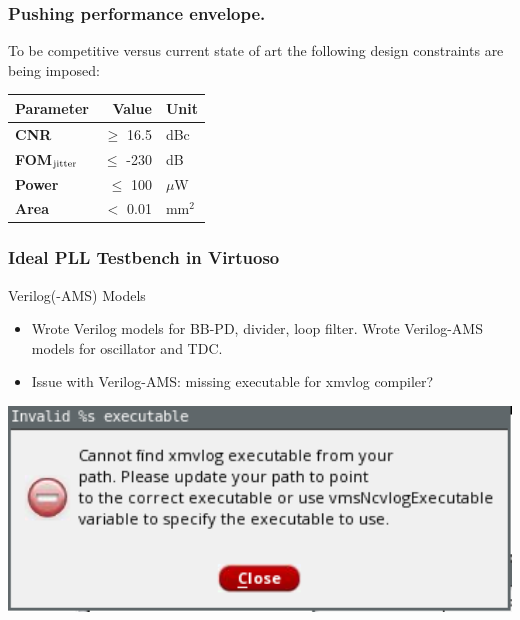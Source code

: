 \documentclass[t, screen, aspectratio=43]{beamer}
\begin{document}
\begin{frame}
	\frametitle{Pushing performance envelope.}
	\begin{block}{}
		\scriptsize
		To be competitive versus current state of art the following design constraints are being imposed:
		\begin{table}[h!]
			\centering
			\def\arraystretch{1.5}		
			\setlength\arrayrulewidth{0.75pt}
			\setlength{\tabcolsep}{1em} %
			\begin{tabular}{|l|r|l|}
				\hline 
				\rule[-1ex]{0pt}{2.5ex} \cellcolor{gray!40}\textbf{Parameter} & \cellcolor{gray!40}\textbf{Value} & \cellcolor{gray!40}\textbf{Unit }\\ 
				\hline 
				\rule[-1ex]{0pt}{2.5ex} \textbf{CNR}  & $\geq$ 16.5 & dBc \\ 
				\hline 
				\rule[-1ex]{0pt}{2.5ex} \textbf{FOM}$_{\textnormal{jitter}}$ & $\leq$ -230 & dB \\ 
				\hline 
				\rule[-1ex]{0pt}{2.5ex} \textbf{Power} & $\leq$ 100  &$\mu$W \\ 
				\hline 
				\rule[-1ex]{0pt}{2.5ex} \textbf{Area} & $<$ 0.01  & mm$^2$ \\ 
				\hline 
			\end{tabular} 
		\end{table}   
	\end{block}    
\end{frame}

\begin{frame}
	\frametitle{Ideal PLL Testbench in Virtuoso}
	\begin{block}{Verilog(-AMS) Models}
	\begin{minipage}{5cm}
		\begin{itemize}[itemsep=4pt,label=\protect---]
			\scriptsize
			\item Wrote Verilog models for BB-PD, divider, loop filter. Wrote Verilog-AMS models for oscillator and TDC.
			\item Issue with Verilog-AMS: missing executable for xmvlog compiler? 
		\end{itemize} 	
	\end{minipage}
	\begin{minipage}{6cm}
		\vspace{1em}
		\hspace{1em}\includegraphics[width=1\textwidth, angle=0]{xmvlog.png}
	\end{minipage}
	\end{block}
\end{frame}
\end{document}
